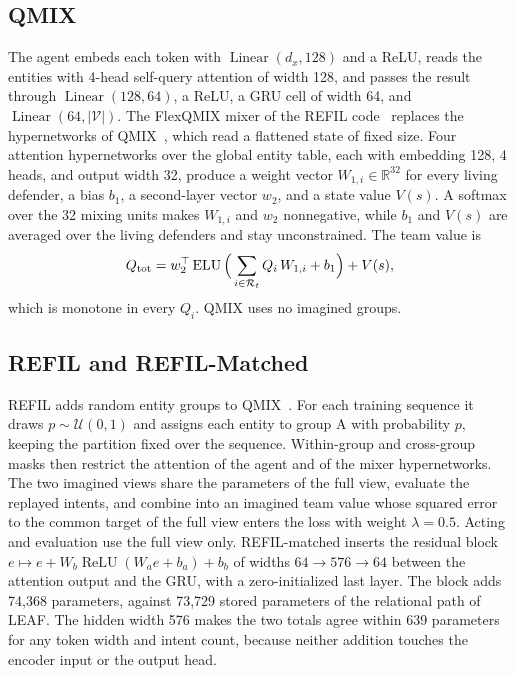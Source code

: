 \subsection{QMIX}
The agent embeds each token with $\operatorname{Linear}(d_x,128)$ and a ReLU, reads the entities with 4-head self-query attention of width 128, and passes the result through $\operatorname{Linear}(128,64)$, a ReLU, a GRU cell of width 64, and $\operatorname{Linear}(64,|\mathcal V|)$. The FlexQMIX mixer of the REFIL code~\cite{iqbal2021refil} replaces the hypernetworks of QMIX~\cite{rashid2018qmix}, which read a flattened state of fixed size. Four attention hypernetworks over the global entity table, each with embedding 128, 4 heads, and output width 32, produce a weight vector $W_{1,i}\in\mathbb R^{32}$ for every living defender, a bias $b_1$, a second-layer vector $w_2$, and a state value $V(s)$. A softmax over the 32 mixing units makes $W_{1,i}$ and $w_2$ nonnegative, while $b_1$ and $V(s)$ are averaged over the living defenders and stay unconstrained. The team value is
\begin{equation}
Q_{\rm tot}=w_2^\top\operatorname{ELU}\Big(\sum_{i\in\mathcal R_t}Q_i\,W_{1,i}+b_1\Big)+V(s),
\label{eq:s-flexqmix}
\end{equation}
which is monotone in every $Q_i$. QMIX uses no imagined groups.

\subsection{REFIL and REFIL-Matched}
REFIL adds random entity groups to QMIX~\cite{iqbal2021refil}. For each training sequence it draws $p\sim\mathcal U(0,1)$ and assigns each entity to group A with probability $p$, keeping the partition fixed over the sequence. Within-group and cross-group masks then restrict the attention of the agent and of the mixer hypernetworks. The two imagined views share the parameters of the full view, evaluate the replayed intents, and combine into an imagined team value whose squared error to the common target of the full view enters the loss with weight $\lambda=0.5$. Acting and evaluation use the full view only. REFIL-matched inserts the residual block $e\mapsto e+W_b\operatorname{ReLU}(W_ae+b_a)+b_b$ of widths $64\to576\to64$ between the attention output and the GRU, with a zero-initialized last layer. The block adds 74,368 parameters, against 73,729 stored parameters of the relational path of LEAF. The hidden width 576 makes the two totals agree within 639 parameters for any token width and intent count, because neither addition touches the encoder input or the output head.

